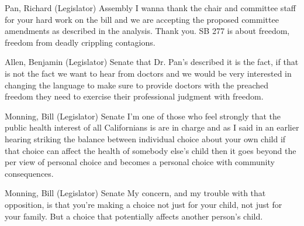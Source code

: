\begin{result}{5.726798835951455}{Pan, Richard (Legislator) Assembly}
I wanna thank the chair and committee staff for your hard work on the bill and we are accepting the proposed committee amendments as described in the analysis. Thank you. SB 277 is about freedom, freedom from deadly crippling contagions.
\end{result}

\begin{result}{5.482719200641232}{Allen, Benjamin (Legislator) Senate}
that Dr. Pan's described it is the fact, if that is not the fact we want to hear from doctors and we would be very interested in changing the language to make sure to provide doctors with the preached freedom they need to exercise their professional judgment with freedom.
\end{result}

\begin{result}{5.292064184905211}{Monning, Bill (Legislator) Senate}
I'm one of those who feel strongly that the public health interest of all Californians is are in charge and as I said in an earlier hearing striking the balance between individual choice about your own child if that choice can affect the health of somebody else's child then it goes beyond the per view of personal choice and becomes a personal choice with community consequences.
\end{result}

\begin{result}{5.059939486344745}{Monning, Bill (Legislator) Senate}
My concern, and my trouble with that opposition, is that you're making a choice not just for your child, not just for your family. But a choice that potentially affects another person's child.
\end{result}

